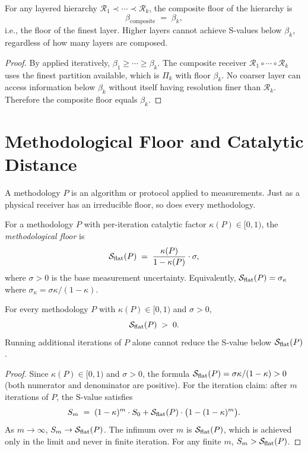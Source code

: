 \begin{proposition}
\label{prop:bottom-floor}
For any layered hierarchy $\mathcal{R}_1 \prec \cdots \prec \mathcal{R}_k$,
the composite floor of the hierarchy is
\[
  \beta_{\mathrm{composite}} \;=\; \beta_k ,
\]
i.e., the floor of the finest layer.  Higher layers cannot achieve
S-values below $\beta_k$, regardless of how many layers are composed.
\end{proposition}

\begin{proof}
By  applied iteratively, $\beta_1 \geq \cdots
\geq \beta_k$.  The composite receiver $\mathcal{R}_1 \circ \cdots \circ
\mathcal{R}_k$ uses the finest partition available, which is $\Pi_k$ with
floor $\beta_k$.  No coarser layer can access information below $\beta_k$
without itself having resolution finer than $\mathcal{R}_k$.  Therefore the
composite floor equals $\beta_k$.
\end{proof}

\section{Methodological Floor and Catalytic Distance}
\label{sec:method-floor}

A methodology $P$ is an algorithm or protocol applied to measurements.  Just
as a physical receiver has an irreducible floor, so does every methodology.

\begin{definition}
\label{def:method-floor}
For a methodology $P$ with per-iteration catalytic factor $\kappa(P) \in [0,1)$,
the \emph{methodological floor} is
\[
  \mathcal{S}_{\mathrm{flat}}(P) \;=\; \frac{\kappa(P)}{1 - \kappa(P)} \cdot \sigma ,
\]
where $\sigma > 0$ is the base measurement uncertainty.  Equivalently,
$\mathcal{S}_{\mathrm{flat}}(P) = \sigma_\kappa$ where $\sigma_\kappa = \sigma\kappa/(1-\kappa)$.
\end{definition}

\begin{theorem}
\label{thm:method-floor-pos}
For every methodology $P$ with $\kappa(P) \in [0, 1)$ and $\sigma > 0$,
\[
  \mathcal{S}_{\mathrm{flat}}(P) \;>\; 0 .
\]
Running additional iterations of $P$ alone cannot reduce the S-value below
$\mathcal{S}_{\mathrm{flat}}(P)$.
\end{theorem}

\begin{proof}
Since $\kappa(P) \in [0,1)$ and $\sigma > 0$, the formula
$\mathcal{S}_{\mathrm{flat}}(P) = \sigma \kappa/(1-\kappa) > 0$ (both numerator and denominator
are positive).  For the iteration claim: after $m$ iterations of $P$, the
S-value satisfies
\[
  S_m \;=\; (1 - \kappa)^m \cdot S_0 + \mathcal{S}_{\mathrm{flat}}(P) \cdot
  \bigl(1 - (1-\kappa)^m\bigr) .
\]
As $m \to \infty$, $S_m \to \mathcal{S}_{\mathrm{flat}}(P)$.  The infimum over $m$ is
$\mathcal{S}_{\mathrm{flat}}(P)$, which is achieved only in the limit and never in
finite iteration.  For any finite $m$, $S_m > \mathcal{S}_{\mathrm{flat}}(P)$.
\end{proof}

